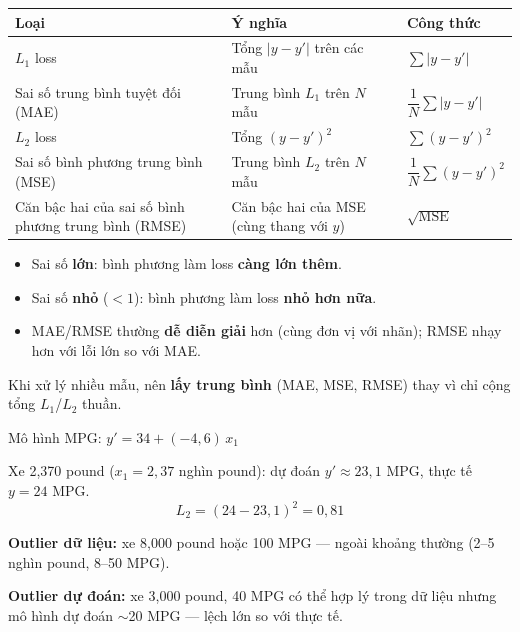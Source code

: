 \documentclass[12pt,a4paper]{article}
\begin{document}
\begin{dinhnghia}[title={Năm loại mất mát thường gặp}]
\begin{tabularx}{\textwidth}{@{}>{\raggedright\arraybackslash}p{4.8cm} X >{\raggedright\arraybackslash}p{4.8cm}@{}}
\textbf{Loại} & \textbf{Ý nghĩa} & \textbf{Công thức} \\
\midrule
$L_1$ loss &
Tổng $|y - y'|$ trên các mẫu &
$\displaystyle\sum |y - y'|$ \\
Sai số trung bình tuyệt đối (MAE) &
Trung bình $L_1$ trên $N$ mẫu &
$\dfrac{1}{N}\displaystyle\sum |y - y'|$ \\
$L_2$ loss &
Tổng $(y - y')^2$ &
$\displaystyle\sum (y - y')^2$ \\
Sai số bình phương trung bình (MSE) &
Trung bình $L_2$ trên $N$ mẫu &
$\dfrac{1}{N}\displaystyle\sum (y - y')^2$ \\
Căn bậc hai của sai số bình phương trung bình (RMSE) &
Căn bậc hai của MSE (cùng thang với $y$) &
$\sqrt{\text{MSE}}$ \\
\end{tabularx}
\end{dinhnghia}

\begin{tinhchat}[title={$L_1$ vs $L_2$ --- ảnh hưởng của bình phương}]
\begin{itemize}
  \item Sai số \textbf{lớn}: bình phương làm loss \textbf{càng lớn thêm}.
  \item Sai số \textbf{nhỏ} ($< 1$): bình phương làm loss \textbf{nhỏ hơn nữa}.
  \item MAE/RMSE thường \textbf{dễ diễn giải} hơn (cùng đơn vị với nhãn); RMSE nhạy hơn với lỗi lớn so với MAE.
\end{itemize}
\end{tinhchat}

\begin{luuy}
Khi xử lý nhiều mẫu, nên \textbf{lấy trung bình} (MAE, MSE, RMSE) thay vì chỉ cộng tổng $L_1$/$L_2$ thuần.
\end{luuy}

\begin{vidu}[title={Vi dụ: Tính $L_2$ loss cho một điểm}]
Mô hình MPG: $y' = 34 + (-4{,}6)\, x_1$

Xe 2{,}370 pound ($x_1 = 2{,}37$ nghìn pound): dự đoán $y' \approx 23{,}1$ MPG, thực tế $y = 24$ MPG.
\[
  L_2 = (24 - 23{,}1)^2 = 0{,}81
\]
\end{vidu}

\begin{ynghia}[title={Ngoại lệ (outlier) trong dữ liệu và trong dự đoán}]
\textbf{Outlier dữ liệu:} xe 8{,}000 pound hoặc 100 MPG --- ngoài khoảng thường (2--5 nghìn pound, 8--50 MPG).

\textbf{Outlier dự đoán:} xe 3{,}000 pound, 40 MPG có thể hợp lý trong dữ liệu nhưng mô hình dự đoán $\sim$20 MPG --- lệch lớn so với thực tế.
\end{ynghia}
\end{document}
